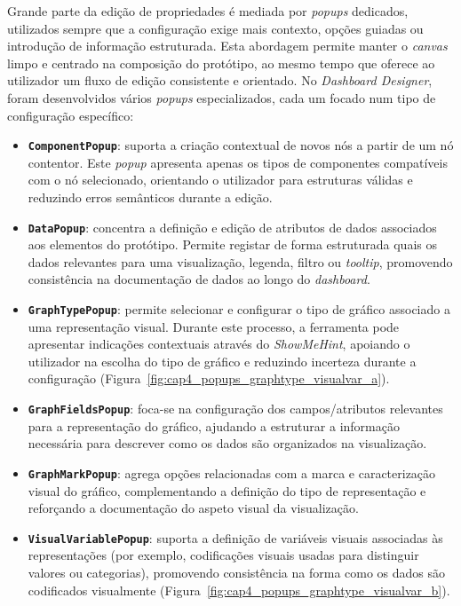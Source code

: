 Grande parte da edição de propriedades é mediada por \textit{popups} dedicados, utilizados sempre que a configuração exige mais contexto, opções guiadas ou introdução de informação estruturada. Esta abordagem permite manter o \textit{canvas} limpo e centrado na composição do protótipo, ao mesmo tempo que oferece ao utilizador um fluxo de edição consistente e orientado. No \textit{Dashboard Designer}, foram desenvolvidos vários \textit{popups} especializados, cada um focado num tipo de configuração específico:

\begin{itemize}
    \item \textbf{\texttt{ComponentPopup}}: suporta a criação contextual de novos nós a partir de um nó contentor. Este \textit{popup} apresenta apenas os tipos de componentes compatíveis com o nó selecionado, orientando o utilizador para estruturas válidas e reduzindo erros semânticos durante a edição.

    \item \textbf{\texttt{DataPopup}}: concentra a definição e edição de atributos de dados associados aos elementos do protótipo. Permite registar de forma estruturada quais os dados relevantes para uma visualização, legenda, filtro ou \textit{tooltip}, promovendo consistência na documentação de dados ao longo do \textit{dashboard}.

    \item \textbf{\texttt{GraphTypePopup}}: permite selecionar e configurar o tipo de gráfico associado a uma representação visual. Durante este processo, a ferramenta pode apresentar indicações contextuais através do \textit{ShowMeHint}, apoiando o utilizador na escolha do tipo de gráfico e reduzindo incerteza durante a configuração (Figura~\ref{fig:cap4_popups_graphtype_visualvar_a}).

    \item \textbf{\texttt{GraphFieldsPopup}}: foca-se na configuração dos campos/atributos relevantes para a representação do gráfico, ajudando a estruturar a informação necessária para descrever como os dados são organizados na visualização.

    \item \textbf{\texttt{GraphMarkPopup}}: agrega opções relacionadas com a marca e caracterização visual do gráfico, complementando a definição do tipo de representação e reforçando a documentação do aspeto visual da visualização.

    \item \textbf{\texttt{VisualVariablePopup}}: suporta a definição de variáveis visuais associadas às representações (por exemplo, codificações visuais usadas para distinguir valores ou categorias), promovendo consistência na forma como os dados são codificados visualmente (Figura~\ref{fig:cap4_popups_graphtype_visualvar_b}).


\end{itemize}
